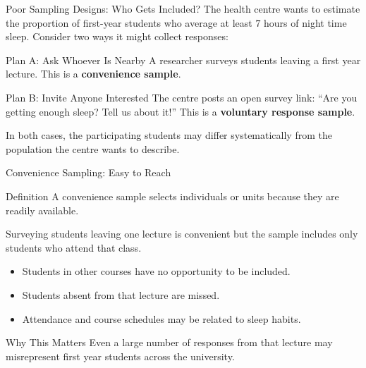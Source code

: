 \documentclass[aspectratio=169]{beamer}
\begin{document}
\begin{frame}{Poor Sampling Designs: Who Gets Included?}
The health centre wants to estimate the proportion of first-year students who average at least $7$ hours of night time sleep. Consider two ways it might collect responses:

\begin{block}{Plan A: Ask Whoever Is Nearby}
A researcher surveys students leaving a first year lecture. This is a \textbf{convenience sample}.
\end{block}

\begin{block}{Plan B: Invite Anyone Interested}
The centre posts an open survey link: ``Are you getting enough sleep? Tell us about it!'' This is a \textbf{voluntary response sample}.
\end{block}

In both cases, the participating students may differ systematically from the population the centre wants to describe.
\end{frame}

\begin{frame}{Convenience Sampling: Easy to Reach}
\begin{block}{Definition}
A convenience sample selects individuals or units because they are readily available.
\end{block}

Surveying students leaving one lecture is convenient but the sample includes only students who attend that class.

\begin{itemize}
	\item Students in other courses have no opportunity to be included.
  	\item Students absent from that lecture are missed.
  	\item Attendance and course schedules may be related to sleep habits.
\end{itemize}

\begin{alertblock}{Why This Matters}
Even a large number of responses from that lecture may misrepresent first year students across the university.
\end{alertblock}
\end{frame}
\end{document}
